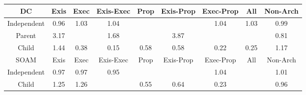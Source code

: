 \begin{tabular}{|c||c|c|c|c|c|c|c|c|}
\hline
\hline
DC & Exis & Exec & Exis-Exec & Prop & Exis-Prop & Exec-Prop & All & Non-Arch \\ 
\hline
Independent & \cellcolor[rgb]{0.9029586519442696,0.8066709525362095,0.41342807514798496} 0.96 & \cellcolor[rgb]{0.9092229592817462,0.8396319280808271,0.42} 1.03 & \cellcolor[rgb]{0.9091090155777974,0.8395779547473777,0.42} 1.04 &  &  & \cellcolor[rgb]{0.9090332973040554,0.8395420881966578,0.42} 1.04 & \cellcolor[rgb]{0.9092988233445151,0.8396678636895071,0.42} 1.03 & \cellcolor[rgb]{0.9088937069081662,0.8347635460319862,0.418967459780955} 0.99 \\ 
\hline
Parent & \cellcolor[rgb]{0.8559026711711775,0.8143749495021366,0.42} 3.17 &  & \cellcolor[rgb]{0.8929937063860562,0.8319443872355002,0.42} 1.68 &  & \cellcolor[rgb]{0.8382668929685532,0.8060211598272095,0.42} 3.87 &  &  & \cellcolor[rgb]{0.8794011177907988,0.6951652908764467,0.39144104327141205} 0.81 \\ 
\hline
Child & \cellcolor[rgb]{0.8990649449284644,0.8348202370713779,0.42} 1.44 & \cellcolor[rgb]{0.8082735264242409,0.35849469174140675,0.32505529132929145} 0.38 & \cellcolor[rgb]{0.7704965821773924,0.17968382230632385,0.2897968100322329} 0.15 & \cellcolor[rgb]{0.8413189583812462,0.5149097363378982,0.35589769448916303} 0.58 & \cellcolor[rgb]{0.8409305834953268,0.5130714285445465,0.3555352112623049} 0.58 & \cellcolor[rgb]{0.7821632337299504,0.23490597298843255,0.30068568481462055} 0.22 & \cellcolor[rgb]{0.7870499851125262,0.2580365961992909,0.30524665277169116} 0.25 & \cellcolor[rgb]{0.9057290851042721,0.837976935049392,0.42} 1.17 \\ 
\hline
\hline
SOAM & Exis & Exec & Exis-Exec & Prop & Exis-Prop & Exec-Prop & All & Non-Arch \\ 
\hline
Independent & \cellcolor[rgb]{0.904444794214003,0.8137053592796137,0.4148151412664027} 0.97 & \cellcolor[rgb]{0.9053383103714356,0.8179346690914617,0.4156490896800065} 0.97 & \cellcolor[rgb]{0.9013994809063627,0.7992908762901166,0.4119728488459385} 0.95 &  &  & \cellcolor[rgb]{0.9089022379820109,0.8394800074651629,0.42} 1.04 &  & \cellcolor[rgb]{0.9098595523404044,0.8399334721612441,0.42} 1.01 \\ 
\hline
Child & \cellcolor[rgb]{0.9037261909595293,0.8370281957176718,0.42} 1.25 & \cellcolor[rgb]{0.9036304622756156,0.8369828505516073,0.42} 1.26 &  & \cellcolor[rgb]{0.8360052941012206,0.4897583920791111,0.3509382744944726} 0.55 & \cellcolor[rgb]{0.8513537338471631,0.5624076735432388,0.3652634849240189} 0.64 & \cellcolor[rgb]{0.7832031544169444,0.23982826424020307,0.3016562774558147} 0.23 &  & \cellcolor[rgb]{0.9036952245292519,0.810157396105125,0.4141155428939683} 0.96 \\ 

\end{tabular}
